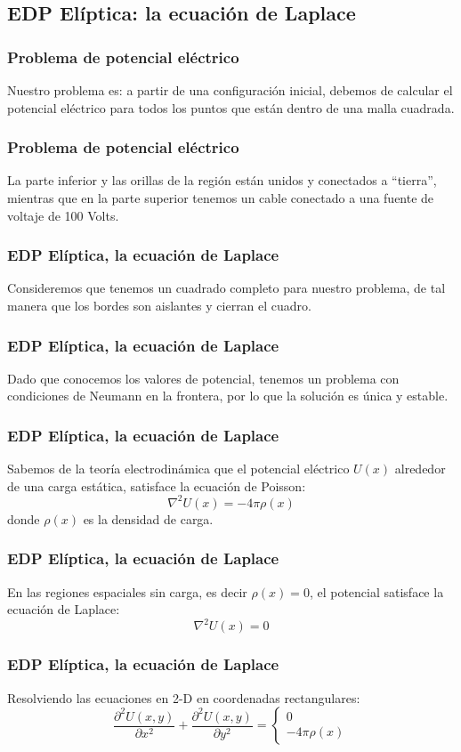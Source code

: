 \subsection{EDP Elíptica: la ecuación de Laplace}
\begin{frame}
\frametitle{Problema de potencial eléctrico}
Nuestro problema es: a partir de una configuración inicial, debemos de calcular el potencial eléctrico para todos los puntos que están dentro de una malla cuadrada.
\end{frame}
\begin{frame}
\frametitle{Problema de potencial eléctrico}
La parte inferior y las orillas de la región están unidos y conectados a \enquote{tierra}, mientras que en la parte superior tenemos un cable conectado a una fuente de voltaje de 100 Volts.
\begin{figure}
	\centering
	
\end{figure}
\end{frame}
\begin{frame}
\frametitle{EDP Elíptica, la ecuación de Laplace}
Consideremos que tenemos un cuadrado completo para nuestro problema, de tal manera que los bordes son aislantes y cierran el cuadro.
\end{frame}
\begin{frame}
\frametitle{EDP Elíptica, la ecuación de Laplace}
Dado que conocemos los valores de potencial, tenemos un problema con condiciones de Neumann en la frontera, por lo que la solución es única y estable.
\end{frame}
\begin{frame}
\frametitle{EDP Elíptica, la ecuación de Laplace}
Sabemos de la teoría electrodinámica que el potencial eléctrico $U(x)$ alrededor de una carga estática, satisface la ecuación de Poisson:
\[ \nabla^{2} U(x) = - 4 \pi \rho(x) \]
donde $\rho(x)$ es la densidad de carga.
\end{frame}
\begin{frame}
\frametitle{EDP Elíptica, la ecuación de Laplace}
En las regiones espaciales sin carga, es decir $\rho(x)=0$, el potencial satisface la ecuación de Laplace:
\[ \nabla^{2} U(x) = 0\]
\end{frame}
\begin{frame}
\frametitle{EDP Elíptica, la ecuación de Laplace}
Resolviendo las ecuaciones en 2-D en coordenadas rectangulares:
\[ \dfrac{\partial^{2} U(x,y)}{\partial x^{2}} + \dfrac{\partial^{2} U(x,y)}{\partial y^{2}}  = \left\lbrace \begin{array}{l}
0 \\
- 4\pi \rho(x)
\end{array} \right. \]
\end{frame}

